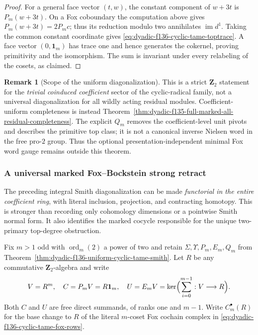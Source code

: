 \documentclass[11pt]{article}
\theoremstyle{definition}
\newtheorem{remark}[theorem]{Remark}
\begin{document}
\begin{proof}
For a general face vector $(t,w)$, the constant
component of $w+3t$ is $P_m(w+3t)$.
On a Fox coboundary the computation above gives
$P_m(w+3t)=2P_m c$; thus its reduction modulo two
annihilates $\operatorname{im}d^1$.
Taking the common constant coordinate gives
\eqref{eq:dyadic-f136-cyclic-tame-toptrace}.
A face vector $(0,\mathbf1_m)$ has trace one
and hence generates the cokernel, proving
primitivity and the isomorphism.  The sum is
invariant under every relabeling of the
cosets, as claimed.
\end{proof}

\begin{remark}[Scope of the uniform diagonalization]
\label{rem:dyadic-f136-cyclic-tame-scope}
This is a strict $\mathbf Z_2$ statement for
the \emph{trivial coinduced coefficient} sector
of the cyclic-radical family, not a universal
diagonalization for all wildly acting residual
modules.  Coefficient-uniform completeness is
instead Theorem~\ref{thm:dyadic-f135-full-marked-all-residual-completeness}.
The explicit $Q_m$ removes the coefficient-level
unit pivots and describes the primitive top class;
it is not a canonical inverse Nielsen word in the
free pro-$2$ group.  Thus the optional
presentation-independent minimal Fox word gauge
remains outside this theorem.
\end{remark}


\subsubsection{A universal marked Fox--Bockstein strong retract}
\label{subsubsec:dyadic-f137-fox-bockstein-retract}

The preceding integral Smith diagonalization can be made
\emph{functorial in the entire coefficient ring}, with
literal inclusion, projection, and contracting homotopy.
This is stronger than recording only cohomology dimensions
or a pointwise Smith normal form.  It also identifies
the marked cocycle responsible for the unique
two-primary top-degree obstruction.

Fix $m>1$ odd with $\operatorname{ord}_m(2)$ a power
of two and retain $\Sigma,\Upsilon,P_m,E_m,Q_m$ from
Theorem~\ref{thm:dyadic-f136-uniform-cyclic-tame-smith}.
Let $R$ be any commutative $\mathbf Z_2$-algebra and
write
\[
V=R^m,\quad C=P_mV=R\mathbf1_m,\quad
U=E_mV=\ker\Bigl(\sum_{i=0}^{m-1}:V\longrightarrow R\Bigr).
\]
Both $C$ and $U$ are free direct summands, of ranks
one and $m-1$.  Write $C^\bullet_m(R)$ for the
base change to $R$ of the literal $m$-coset
Fox cochain complex in
\eqref{eq:dyadic-f136-cyclic-tame-fox-rows}.
\end{document}
